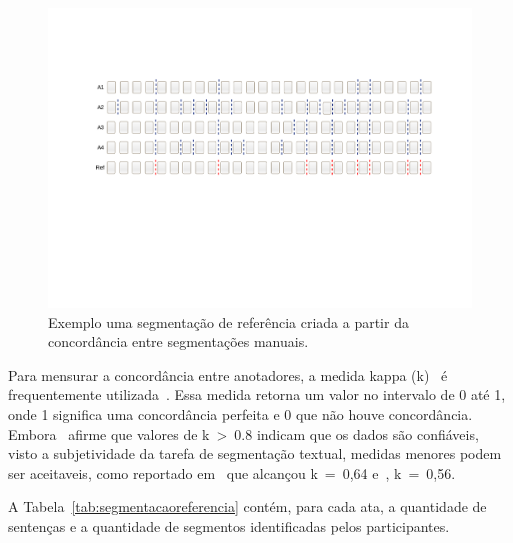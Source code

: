 \begin{center}
	\begin{figure}

	\includegraphics[trim={ 95 255 75 140 },clip,page=1,width=\textwidth]{conteudo/capitulos/figs/segmentacao-referencia.pdf}

	\caption{Exemplo uma segmentação de referência criada a partir da concordância entre segmentações manuais.}
	\label{fig:concordanciasegref}
	\end{figure}
\end{center}


Para mensurar a concordância entre anotadores, a medida kappa (k)~\cite{Carletta1996} é frequentemente utilizada~\cite{Gruenstein2007, Cardoso2017, Hearst1997}. Essa medida retorna um valor no intervalo de 0 até 1, onde 1 significa uma concordância perfeita e 0 que não houve concordância. Embora~\cite{Carletta1996} afirme que valores de k~>~0.8 indicam que os dados são confiáveis, visto a subjetividade da tarefa de segmentação textual, medidas menores podem ser aceitaveis, como reportado em~\cite{Hearst1997} que alcançou k~=~0,64 e~\cite{Cardoso2017}, k~=~0,56.  

A Tabela~\ref{tab:segmentacaoreferencia} contém, para cada ata, a quantidade de sentenças e a quantidade de segmentos identificadas pelos participantes.


